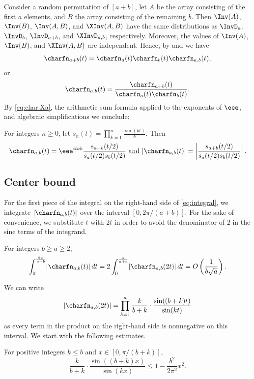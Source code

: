 Consider a random permutation of $[a+b]$, let $A$ be the array consisting of the first $a$ elements, and $B$ the array consisting of the remaining $b$. Then $\Inv(A)$, $\Inv(B)$, $\Inv(A,B)$, and $\XInv(A,B)$ have the same distributions as $\InvD_a$, $\InvD_b$, $\InvD_{a+b}$, and $\XInvD_{a,b}$, respectively. Moreover, the values of $\Inv(A)$, $\Inv(B)$, and $\XInv(A,B)$ are independent. Hence, by  and  we have
\[\charfn_{a+b}(t)=\charfn_{a}(t)\charfn_{b}(t)\charfn_{a,b}(t), \]
or
\[\charfn_{a,b}(t)=\frac{\charfn_{a+b}(t)}{\charfn_a(t)\charfn_b(t)}. \]
By \eqref{eq:char:Xa}, the arithmetic sum formula applied to the exponents of $\eee$, and algebraic simplifications we conclude:
\begin{proposition}
\label{prop:characteristicfunction}
For integers $n\ge 0$, let $s_n(t)=\prod_{k=1}^n\frac{\sin(kt)}{k}$. Then 
    \[\charfn_{a,b}(t)=\eee^{itab}\frac{s_{a+b}(t/2)}{s_a(t/2)s_b(t/2)}
    \text{ and } \lvert\charfn_{a,b}(t)\rvert=\left| \frac{s_{a+b}(t/2)}{s_a(t/2)s_b(t/2)}\right|. 
    \]
\end{proposition}

\subsection{Center bound}
\label{sec:central}

For the first piece of the integral on the right-hand side of \eqref{eq:integral}, we integrate $\lvert\charfn_{a,b}(t)\rvert$ over the interval $[0,2\pi/(a+b)]$. For the sake of convenience, we substitute $t$ with $2t$ in order to avoid the denominator of $2$ in the sine terms of the integrand. 

\begin{lemma}
    \label{lemma:center}
    For integers $b\ge a\ge 2$,
    \[ \int_0^{\frac{2\pi}{a+b}} \lvert\charfn_{a,b}(t)\rvert\, dt = 2 \int_0^{\frac{\pi}{a+b}} \lvert\charfn_{a,b}(2t)\rvert\, dt = O\left(\frac{1}{b\sqrt{a}}\right). \]    
\end{lemma}

We can write 
\[\lvert\charfn_{a,b}(2t)\rvert=\prod_{k=1}^{a} \frac{k}{b+k}\cdot\frac{\sin((b+k)t)}{\sin(kt)} \]
as every term in the product on the right-hand side is nonnegative on this interval. We start with the following estimates.

\begin{claim}
    \label{claim:center3}
    For positive integers $k\le b$ and $x\in [0,\pi/(b+k)]$,
    \[\frac{k}{b+k}\cdot \frac{\sin((b+k)x)}{\sin(kx)}\le 1-\frac{b^2}{2\pi^2}x^2. \]
\end{claim}

